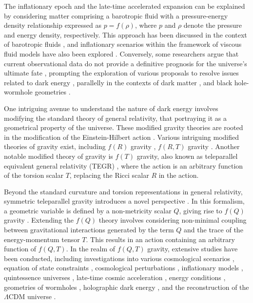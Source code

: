 \documentclass[aps,prd,showpacs,nofootinbib,floats,floatfix,preprintnumbers,groupedaddress,twocolumn]{revtex4-1}
\begin{document}
    The inflationary epoch and the late-time accelerated expansion can be explained by considering matter comprising a barotropic fluid with a pressure-energy density relationship expressed as $p=f(\rho)$, where $p$ and $\rho$ denote the pressure and energy density, respectively. This approach has been discussed in the context of barotropic fluids \cite{Nojiri1,Nojiri2}, and inflationary scenarios within the framework of viscous fluid models have also been explored \cite{Bamba}. Conversely, some researchers argue that current observational data do not provide a definitive prognosis for the universe's ultimate fate \cite{Astas}, prompting the exploration of various proposals to resolve issues related to dark energy \cite{Ratra,Caldwell1,Buchert,Picon,Tomita,Milton,Hunt,Easson,Radicella,Pavn,Pandey}, parallelly in the contexts of dark matter \cite{G1}, and black hole-wormhole geometries \cite{G2,G3,G4,G5,G6,G7}.

    One intriguing avenue to understand the nature of dark energy involves modifying the standard theory of general relativity, that portraying it as a geometrical property of the universe. These modified gravity theories are rooted in the modification of the Einstein-Hilbert action \cite{Palia}. Various intriguing modified theories of gravity exist, including $f(R)$ gravity \cite{Soti,fr}, $f(R,T)$ gravity \cite{Har}. Another notable modified theory of gravity is $f(T)$ gravity, also known as teleparallel equivalent general relativity (TEGR) \cite{Bengochea,Ferraro,Linder1,Cai}, where the action is an arbitrary function of the torsion scalar $T$, replacing the Ricci scalar $R$ in the action.

    Beyond the standard curvature and torsion representations in general relativity, symmetric teleparallel gravity introduces a novel perspective \cite{Nester}. In this formalism, a geometric variable is defined by a non-metricity scalar $Q$, giving rise to $f(Q)$ gravity \cite{Lavinia}. Extending the $f(Q)$ theory involves considering non-minimal coupling between gravitational interactions generated by the term $Q$ and the trace of the energy-momentum tensor $T$. This results in an action containing an arbitrary function of $f(Q,T)$. In the realm of $f(Q,T)$ gravity, extensive studies have been conducted, including investigations into various cosmological scenarios \cite{Nisha,Xu,Gad}, equation of state constraints \cite{Simran3}, cosmological perturbations \cite{Antonio}, inflationary models \cite{Maryam}, quintessence universes \cite{Koussour}, late-time cosmic acceleration \cite{Lalke}, energy conditions \cite{Simran1,Simran2}, geometries of wormholes \cite{Tayde}, holographic dark energy \cite{Asutosh}, and the reconstruction of the $\Lambda$CDM universe \cite{gaurav}.
\end{document}
